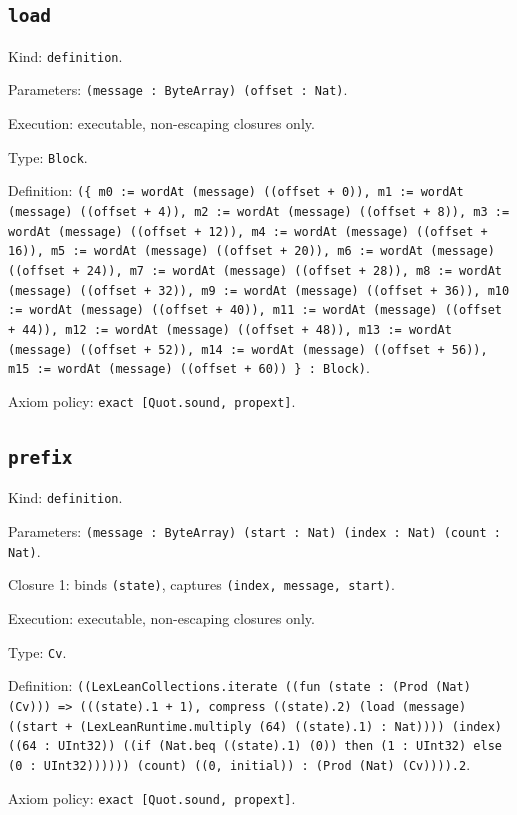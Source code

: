 \documentclass[11pt]{article}
\begin{document}
\subsection*{\texttt{load}}
\noindent Kind: \texttt{definition}.\par
\noindent Parameters: \texttt{(message : ByteArray) (offset : Nat)}.\par
\noindent Execution: executable, non-escaping closures only.\par
\noindent Type: \texttt{Block}.\par
\noindent Definition: \texttt{(\{ m0 := wordAt (message) ((offset + 0)), m1 := wordAt (message) ((offset + 4)), m2 := wordAt (message) ((offset + 8)), m3 := wordAt (message) ((offset + 12)), m4 := wordAt (message) ((offset + 16)), m5 := wordAt (message) ((offset + 20)), m6 := wordAt (message) ((offset + 24)), m7 := wordAt (message) ((offset + 28)), m8 := wordAt (message) ((offset + 32)), m9 := wordAt (message) ((offset + 36)), m10 := wordAt (message) ((offset + 40)), m11 := wordAt (message) ((offset + 44)), m12 := wordAt (message) ((offset + 48)), m13 := wordAt (message) ((offset + 52)), m14 := wordAt (message) ((offset + 56)), m15 := wordAt (message) ((offset + 60)) \} : Block)}.\par
\noindent Axiom policy: \texttt{exact [Quot.sound, propext]}.\par
\subsection*{\texttt{prefix}}
\noindent Kind: \texttt{definition}.\par
\noindent Parameters: \texttt{(message : ByteArray) (start : Nat) (index : Nat) (count : Nat)}.\par
\noindent Closure 1: binds \texttt{(state)}, captures \texttt{(index, message, start)}.\par
\noindent Execution: executable, non-escaping closures only.\par
\noindent Type: \texttt{Cv}.\par
\noindent Definition: \texttt{((LexLeanCollections.iterate ((fun (state : (Prod (Nat) (Cv))) => (((state).1 + 1), compress ((state).2) (load (message) ((start + (LexLeanRuntime.multiply (64) ((state).1) : Nat)))) (index) ((64 : UInt32)) ((if (Nat.beq ((state).1) (0)) then (1 : UInt32) else (0 : UInt32)))))) (count) ((0, initial)) : (Prod (Nat) (Cv)))).2}.\par
\noindent Axiom policy: \texttt{exact [Quot.sound, propext]}.\par
\end{document}
